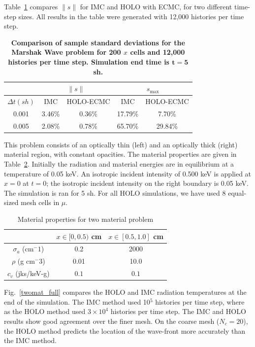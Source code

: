 \documentclass{mc2013}
\renewcommand{\ss}{\ensuremath{\|s\|}}
\begin{document}
Table~\ref{marshak_var} compares $\ss$ for IMC and HOLO with ECMC, for two different
time-step sizes. All results in the table were generated
with 12,000 histories per time step.  
\begin{table}[H]
\centering
\caption{\label{marshak_var} \textbf{Comparison of sample standard deviations for the Marshak Wave problem
    for 200 $x$ cells and 12,000 histories per time step.   Simulation end time is $\mathbf{t=5}$ sh.}}
\vspace{-0.1in}
\begin{tabular}{|c|cc|cc|}\cline{2-5}
    \multicolumn{1}{c|}{}       & \multicolumn{2}{|c|}{\ss} & \multicolumn{2}{|c|}{$s_{\max}$} \\ \hline
$\Delta t (sh)$   & IMC & HOLO-ECMC  &  IMC & HOLO-ECMC   \\ \hline
   0.001	      & 3.46\%  & 0.36\% &  17.79\%    &  7.70\%            \\
   0.005          & 2.08\%  & 0.78\% &  65.70\%    & 29.84\%     \\ \hline
\end{tabular}
\end{table}




This problem consists of an optically thin (left) and an optically thick (right) material region,
with constant opacities.  The material properties are given in
Table~\ref{two_mat_props}.  Initially the radiation and material energies are in
equilibrium at a temperature of 0.05 keV.  An isotropic incident intensity of 0.500 keV
is applied at $x=0$ at $t=0$; the isotropic incident intensity on the right boundary is 0.05
keV.  The simulation is ran for 5 sh. For all HOLO simulations, we have used 8 equal-sized mesh cells in $\mu$.
\begin{table}[H]
        \caption{Material properties for two material problem\label{two_mat_props}}
\centering
        \begin{tabular}{|c|cc|}  \cline{2-3}
            \multicolumn{1}{c|}{}   & $x \in [0,0.5)$ cm & $x \in [0.5,1.0]$ cm   \\ \hline
            $\sigma_a$ (cm$^-1$)  & 0.2 & 2000 \\
            $\rho$ (g cm$^-3$) & 0.01 & 10.0 \\
            $c_v$ (jks/keV-g) & $0.1$ & $0.1$ \\ \hline
        \end{tabular}
\end{table}
Fig.~\ref{twomat_full} compares the HOLO and IMC radiation 
temperatures at the end of the simulation. The IMC method used 10$^5$ histories per
time step, where as the HOLO method used $3\times10^4$ histories per time step.  The
IMC and HOLO results show good agreement
over the finer mesh.
On the coarse mesh ($N_c=20$), the HOLO method predicts the location of the
wave-front more accurately than the IMC method. 
\end{document}
